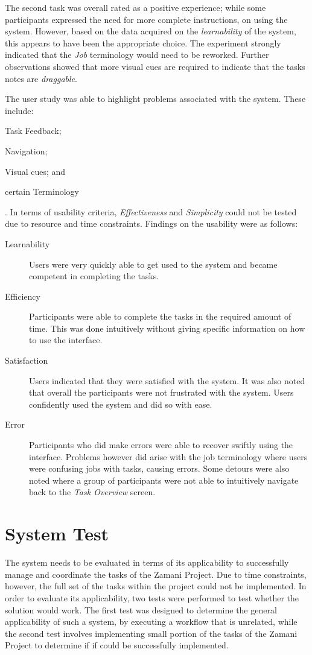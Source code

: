 \noindent The second task was overall rated as a positive experience; while some participants
expressed the need for more complete instructions, on using
the system. However, based on the data acquired on the \emph{learnability} of the
system, this appears to have been the appropriate choice. The experiment strongly
indicated that the \emph{Job} terminology would need to be reworked. Further
observations showed that more visual cues are required to indicate that the
tasks notes are \emph{draggable}.

The user study was able to highlight problems associated with the system. These
include: \begin{inparaenum}[(i)]\item Task Feedback; \item Navigation; \item
Visual cues; and \item certain Terminology\end{inparaenum}. In terms of
usability criteria, \emph{Effectiveness} and \emph{Simplicity} could not be
tested due to resource and time constraints. Findings on the usability were as
follows:

\begin{description}
\item[Learnability] Users were very quickly able to get used to the system and
	became competent in completing the tasks.
\item[Efficiency] Participants were able to complete the tasks in the required
	amount of time. This was done intuitively without giving specific
	information on how to use the interface.
\item[Satisfaction] Users indicated that they were satisfied with the system. It
	was also noted that overall the participants were not frustrated with
	the system. Users confidently used the system and did so with ease.
\item[Error] Participants who did make errors were able to recover swiftly
	using the interface. Problems however did arise with the job terminology
	where users were confusing jobs with tasks, causing errors. Some detours
	were also noted where a group of participants were not able to
	intuitively navigate back to the \emph{Task Overview} screen.
\end{description}



\section{System Test}
The system needs to be evaluated in terms of its applicability to successfully 
manage and coordinate the tasks of the Zamani Project.
 Due to time constraints, however, the full set of the tasks within the project
could not be implemented. In order to evaluate its applicability,  two tests were
 performed to test whether the  solution would work. The first test was designed to
determine the general applicability of such a system, by executing a workflow that
is unrelated, while the second test involves implementing small portion of the tasks
of the Zamani Project to determine if if could be successfully implemented.

